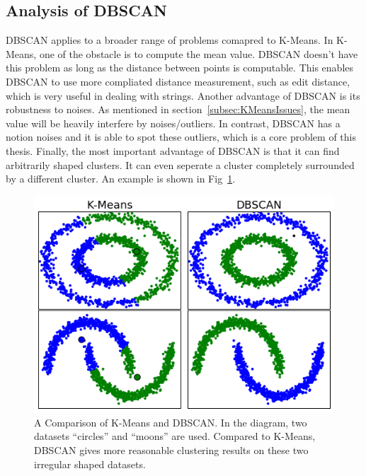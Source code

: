 \subsection{Analysis of DBSCAN}
\label{subsec:DBSCANalgorithm}
DBSCAN applies to a broader range of problems comapred to K-Means. In K-Means, one of the obstacle is to compute the mean value. DBSCAN doesn't have this problem as long as the distance between points is computable. This enables DBSCAN to use more compliated distance measurement, such as edit distance, which is very useful in dealing with strings. Another advantage of DBSCAN is its robustness to noises. As mentioned in section~\ref{subsec:KMeansIssues}, the mean value will be heavily interfere by noises/outliers. In contrast, DBSCAN has a notion noises and it is able to spot these outliers, which is a core problem of this thesis. Finally, the most important advantage of DBSCAN is that it can find arbitrarily shaped clusters. It can even seperate a cluster completely surrounded by a different cluster. An example is shown in Fig~\ref{fig:KMeansDBSCAN}.

\begin{figure}
	\begin{center}
		\includegraphics[width=\textwidth]{images/KMeansDBSCAN.png}
		\caption{A Comparison of K-Means and DBSCAN. In the diagram, two datasets ``circles'' and ``moons'' are used. Compared to K-Means, DBSCAN gives more reasonable clustering results on these two irregular shaped datasets.}
		\label{fig:KMeansDBSCAN}
	\end{center}
\end{figure}

